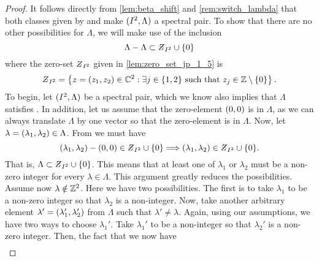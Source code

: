 \documentclass[../thesis.tex]{subfiles}
\begin{document}
\begin{proof}
    It follows directly from \cref{lem:beta_shift} and \cref{rem:switch_lambda} that both classes given by  and  make $(I^2,\Lambda)$ a spectral pair. To show that there are no other possibilities for $\Lambda$, we will make use of the inclusion
    \begin{equation}\label{eq:inclusion_dim_2}
        \Lambda - \Lambda \subset \Zstroke_{I^2} \cup \braq{0}
    \end{equation}
    where the zero-set $\Zstroke_{I^2}$ given in \cref{lem:zero_set_jp_1_5} is
    \begin{equation*}\label{eq:zeroset_dim_2}
        \Zstroke_{I^2} = \braqMed{z = \brac{z_1,z_2} \in \C^2 : \exists \space j \in \braq{1,2} \text{ such that } z_j \in \intnozero}.
    \end{equation*}
    To begin, let $(I^2,\Lambda)$ be a spectral pair, which we know also implies that $\Lambda$ satisfies . In addition, let us assume that the zero-element $(0,0)$ is in $\Lambda$, as we can always translate $\Lambda$ by one vector so that the zero-element is in $\Lambda$. Now, let $\lambda = (\lambda_1,\lambda_2) \in \Lambda$. From  we must have
    \begin{equation*}  %
        \bracMed{\lambda_1, \lambda_2} - \bracMed{0,0} \in \Zstroke_{I^2} \cup \braq{0} \Longrightarrow \brac{\lambda_1, \lambda_2} \in \Zstroke_{I^2} \cup \braq{0}.
    \end{equation*}
    That is, $\Lambda \subset \Zstroke_{I^2} \cup \braq{0}$. This means that at least one of $\lambda_1$ or $\lambda_2$ must be a non-zero integer for every $\lambda \in \Lambda$. This argument greatly reduces the possibilities. Assume now $\lambda\notin \mathbb{Z}^2$. Here we have two possibilities. The first is to take $\lambda_1$ to be a non-zero integer so that $\lambda_2$ is a non-integer. Now, take another arbitrary element $\lambda' = (\lambda_1',\lambda_2')$ from $\Lambda$ such that $\lambda'\neq \lambda$. Again, using our assumptions, we have two ways to choose $\lambda_1'$. Take $\lambda_1'$ to be a non-integer so that $\lambda_2'$ is a non-zero integer. Then, the fact that we now have 
    \begin{align*}  %

\end{align*}
\end{proof}
\end{document}
